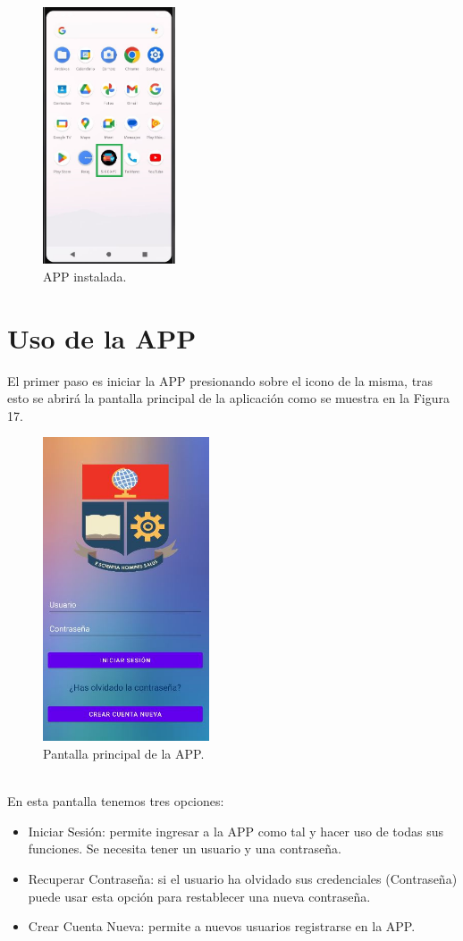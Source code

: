 \documentclass[a4paper,10pt, oneside, titlepage]{article}
\begin{document}
	\begin{figure}[!h]
		\centering
		\includegraphics[width = 0.45\linewidth, height = 7.6cm]{16.jpg}
		\caption{APP instalada.}
	\end{figure}
	
	\section{Uso de la APP}
	El primer paso es iniciar la APP presionando sobre el icono de la misma, tras esto se abrirá la pantalla principal de la aplicación como se muestra en la Figura 17.
	\begin{figure}[!h]
		\centering
		\includegraphics[width = 0.45\linewidth, height = 9cm]{17.jpg}
		\caption{Pantalla principal de la APP.}
	\end{figure}\\
	En esta pantalla tenemos tres opciones:
	\begin{itemize}
		\item Iniciar Sesión: permite ingresar a la APP como tal y hacer uso de todas sus funciones. Se necesita tener un usuario y una contraseña.
		\item Recuperar Contraseña: si el usuario ha olvidado sus credenciales (Contraseña) puede usar esta opción para restablecer una nueva contraseña.
		\item Crear Cuenta Nueva: permite a nuevos usuarios registrarse en la APP. 
	\end{itemize}
\end{document}
